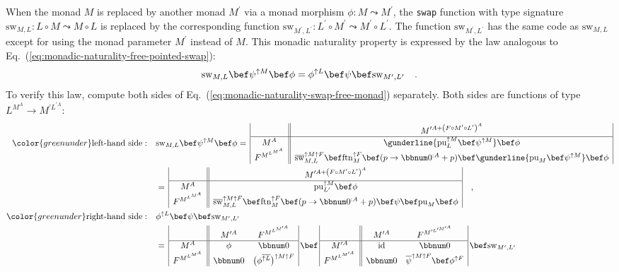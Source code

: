 When the monad $M$ is replaced by another monad $M^{\prime}$ via
a monad morphism $\phi:M\leadsto M^{\prime}$, the \lstinline!swap!
function with type signature $\text{sw}_{M,L}:L\circ M\leadsto M\circ L$
is replaced by the corresponding function $\text{sw}_{M^{\prime},L^{\prime}}:L^{\prime}\circ M^{\prime}\leadsto M^{\prime}\circ L^{\prime}$.
The function $\text{sw}_{M^{\prime},L^{\prime}}$ has the same code
as $\text{sw}_{M,L}$ except for using the monad parameter $M^{\prime}$
instead of $M$. This monadic naturality property is expressed by
the law analogous to Eq.~(\ref{eq:monadic-naturality-free-pointed-swap}):
\begin{equation}
\text{sw}_{M,L}\bef\psi^{\uparrow M}\bef\phi=\phi^{\uparrow L}\bef\psi\bef\text{sw}_{M^{\prime},L^{\prime}}\quad.\label{eq:monadic-naturality-swap-free-monad}
\end{equation}
To verify this law, compute both sides of Eq.~(\ref{eq:monadic-naturality-swap-free-monad})
separately. Both sides are functions of type $L^{M^{A}}\rightarrow M^{\prime L^{\prime A}}$:
\begin{align*}
{\color{greenunder}\text{left-hand side}:}\quad & \text{sw}_{M,L}\bef\psi^{\uparrow M}\bef\phi=\,\begin{array}{|c||c|}
 & M^{\prime A+\left(F\circ M^{\prime}\circ L^{\prime}\right)^{A}}\\
\hline M^{A} & \gunderline{\text{pu}_{L}^{\uparrow M}\bef\psi^{\uparrow M}}\bef\phi\\
F^{M^{L^{M^{A}}}} & \overline{\text{sw}}_{M,L}^{\uparrow M\uparrow F}\bef\text{ftn}_{M}^{\uparrow F}\bef(p\rightarrow\bbnum 0^{:A}+p)\bef\gunderline{\text{pu}_{M}\bef\psi^{\uparrow M}}\bef\phi
\end{array}\\
 & =\,\begin{array}{|c||c|}
 & M^{\prime A+\left(F\circ M^{\prime}\circ L^{\prime}\right)^{A}}\\
\hline M^{A} & \text{pu}_{L^{\prime}}^{\uparrow M}\bef\phi\\
F^{M^{L^{M^{A}}}} & \overline{\text{sw}}_{M,L}^{\uparrow M\uparrow F}\bef\text{ftn}_{M}^{\uparrow F}\bef(p\rightarrow\bbnum 0^{:A}+p)\bef\psi\bef\text{pu}_{M}\bef\phi
\end{array}\quad,\\
{\color{greenunder}\text{right-hand side}:}\quad & \phi^{\uparrow L}\bef\psi\bef\text{sw}_{M^{\prime},L^{\prime}}\\
 & =\,\begin{array}{|c||cc|}
 & M^{\prime A} & F^{M^{L^{M^{\prime A}}}}\\
\hline M^{A} & \phi & \bbnum 0\\
F^{M^{L^{M^{A}}}} & \bbnum 0 & \big(\phi^{\overline{\uparrow L}}\big)^{\uparrow M\uparrow F}
\end{array}\,\bef\,\begin{array}{|c||cc|}
 & M^{\prime A} & F^{M^{\prime L^{\prime M^{\prime A}}}}\\
\hline M^{\prime A} & \text{id} & \bbnum 0\\
F^{M^{L^{M^{\prime A}}}} & \bbnum 0 & \overline{\psi}^{\uparrow M\uparrow F}\bef\phi^{\uparrow F}
\end{array}\,\bef\text{sw}_{M^{\prime},L^{\prime}}
\end{align*}
